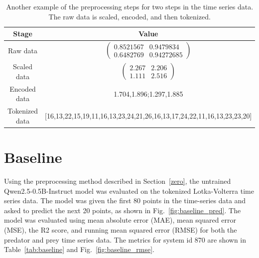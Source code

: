 \documentclass[11pt,a4paper]{article}
\begin{document}
\begin{table}
    \centering
    \begin{tabular}{c|c}
        Stage & Value \\
        \hline
        Raw data & $\begin{pmatrix} 0.8521567 & 0.9479834   \\ 0.6482769  & 0.94272685  \end{pmatrix}$ \\
        Scaled data & $\begin{pmatrix} 2.267 & 2.206 \\ 1.111 & 2.516 \end{pmatrix}$ \\
        Encoded data & 1.704,1.896;1.297,1.885 \\
        Tokenized data & [16,13,22,15,19,11,16,13,23,24,21,26,16,13,17,24,22,11,16,13,23,23,20]
    \end{tabular}
    \caption{Another example of the preprocessing steps for two steps in the time series data. The raw data is scaled, encoded, and then tokenized.}
    \label{tab:example2}
\end{table}
\clearpage
\section{Baseline}
\label{sec:baseline}
Using the preprocessing method described in Section~\ref{zero}, the untrained Qwen2.5-0.5B-Instruct model was evaluated on the tokenized Lotka-Volterra time series data. The model was given the first 80 points in the time-series data and asked to predict the next 20 points, as shown in Fig.~\ref{fig:baseline_pred}. The model was evaluated using mean absolute error (MAE), mean squared error (MSE), the R2 score, and running mean squared error (RMSE) for both the predator and prey time series data. The metrics for system id 870 are shown in Table~\ref{tab:baseline} and Fig.~\ref{fig:baseline_rmse}.
\end{document}
